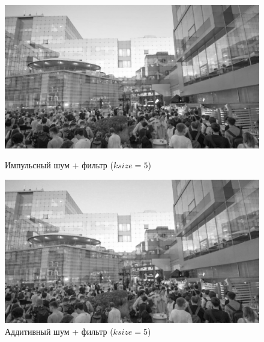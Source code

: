 \documentclass[a4paper]{article}
\begin{document}
\begin{figure}[H]
    \begin{minipage}{0.49\textwidth}
        \centering \includegraphics[width=\textwidth]{images/3_nonlinear_filters/impulse - 2d-median (ksize=5).jpg}
        \caption{Импульсный шум + фильтр ($ksize = 5$)}
    \end{minipage}\hfill
    \begin{minipage}{0.49\textwidth}
        \centering \includegraphics[width=\textwidth]{images/3_nonlinear_filters/additive - 2d-median (ksize=5).jpg}
        \caption{Аддитивный шум + фильтр ($ksize = 5$)}
    \end{minipage}
\end{figure}
\end{document}
